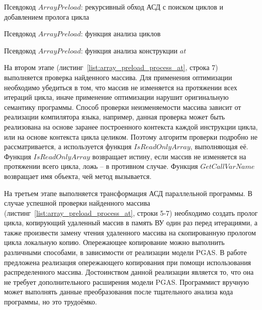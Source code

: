 \begin{ListingEnv}[!h]
	\small {}
    \caption{Псевдокод $ArrayPreload$: рекурсивный обход АСД с поиском циклов и 
добавлением пролога цикла}    
    \label{list:array_preload_visit}
\end{ListingEnv}

\begin{ListingEnv}[!h]
	\small {}
    \caption{Псевдокод $ArrayPreload$: функция анализа циклов}
    \label{list:array_preload_process_loop}
\end{ListingEnv} 
 
\begin{ListingEnv}[!h]
	\small {}
    \caption{Псевдокод $ArrayPreload$: функция анализа конструкции $at$}
    \label{list:array_preload_process_at}
\end{ListingEnv} 

На втором этапе (листинг~\ref{list:array_preload_process_at}, строка 7) 
выполняется проверка найденного массива. Для применения оптимизации необходимо 
убедиться в том, что массив не изменяется на протяжении всех итераций цикла, 
иначе применение оптимизации нарушит оригинальную семантику программы. Способ 
проверки неизменяемости массива зависит от реализации компилятора языка, 
например, данная проверка может быть реализована на основе заранее построенного 
контекста каждой инструкции цикла, или на основе контекста цикла целиком. 
Поэтому алгоритм проверки подробно не рассматривается, а используется функция 
$IsReadOnlyArray$, выполняющая её. Функция $IsReadOnlyArray$ возвращает истину, 
если массив не изменяется на протяжении всего цикла, ложь -- в противном случае. 
Функция $GetCallVarName$ возвращает имя объекта, чей метод вызывается.

На третьем этапе выполняется трансформация АСД параллельной программы. В случае 
успешной проверки найденного массива 
(листинг~\ref{list:array_preload_process_at}, строки 5-7) необходимо создать 
пролог цикла, копирующий удаленный массив в память ВУ один раз перед итерациями, 
а также произвести замену чтения удаленного массива на скопированную прологом 
цикла локальную копию. Опережающее копирование можно выполнить различными 
способами, в зависимости от реализации модели PGAS. В работе предложена 
реализация опережающего копирования при помощи использования распределенного 
массива. Достоинством данной реализации является то, что она не требует 
дополнительного расширения модели PGAS. Программист вручную может выполнять 
данные преобразования после тщательного анализа кода программы, но это 
трудоёмко.

